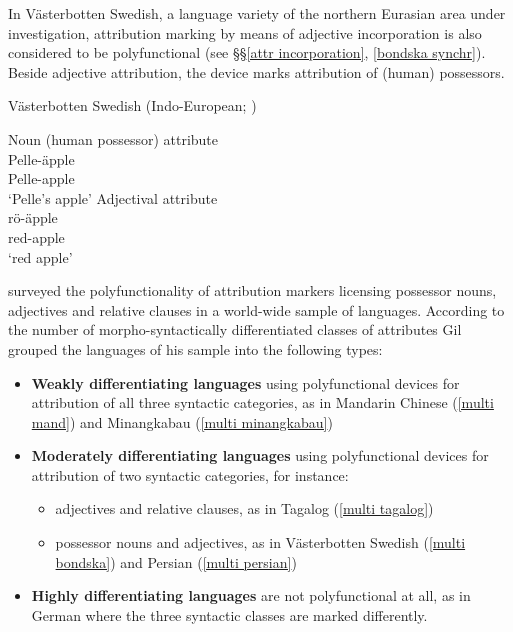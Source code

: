 In Västerbotten Swedish, a language variety of the northern Eurasian area under investigation, attribution marking by means of adjective incorporation is also considered to be polyfunctional (see \S\S\ref{attr incorporation}, \ref{bondska synchr}). Beside adjective attribution, the device marks attribution of (human) possessors.
\begin{exe}
\ex 
\label{multi bondska}
\rm{Västerbotten Swedish (Indo-European; \citealt[examples from][5]{gil2005})}
\begin{xlist}
\ex \rm{Noun (human possessor) attribute}\\
\gll	Pelle-äpple\\
	Pelle-apple\\
\glt	‘Pelle's apple’
\ex \rm{Adjectival attribute}\\
\gll	rö-äpple\\
	red-apple\\
\glt	‘red apple’
\end{xlist}
\end{exe}
\cite{gil2005} surveyed the polyfunctionality of attribution markers licensing possessor nouns, adjectives and relative clauses in a world-wide sample of languages. According to the number of morpho-syntactically differentiated classes of attributes Gil grouped the languages of his sample into the following types:
\begin{itemize}
\item \textbf{Weakly differentiating languages} using polyfunctional devices for attribution of all three syntactic categories, as in Mandarin Chinese (\ref{multi mand}) and Minangkabau (\ref{multi minangkabau})
\item \textbf{Moderately differentiating languages} using polyfunctional devices for attribution of two syntactic categories, for instance:
	\begin{itemize}
	\item adjectives and relative clauses, as in Tagalog (\ref{multi tagalog})
	\item possessor nouns and adjectives, as in Västerbotten Swedish (\ref{multi bondska}) and Persian (\ref{multi persian})
	\end{itemize}
\item \textbf{Highly differentiating languages} are not polyfunctional at all, as in German where the three syntactic classes are marked differently.
\end{itemize}
